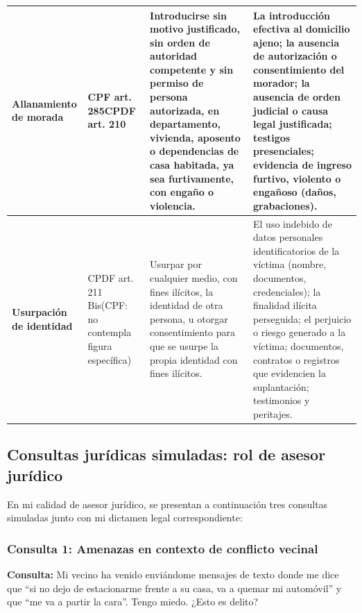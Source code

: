 \documentclass[12pt,letterpaper]{article}
\begin{document}
\begin{landscape}
\begin{longtable}{|>{\raggedright\arraybackslash}p{3.5cm}|>{\raggedright\arraybackslash}p{3cm}|>{\raggedright\arraybackslash}p{8cm}|>{\raggedright\arraybackslash}p{5cm}|}
\textbf{Allanamiento de morada} & CPF art. 285\newline CPDF art. 210 & 
Introducirse sin motivo justificado, sin orden de autoridad competente y sin permiso de persona autorizada, en departamento, vivienda, aposento o dependencias de casa habitada, ya sea furtivamente, con engaño o violencia. & 
La introducción efectiva al domicilio ajeno; la ausencia de autorización o consentimiento del morador; la ausencia de orden judicial o causa legal justificada; testigos presenciales; evidencia de ingreso furtivo, violento o engañoso (daños, grabaciones). \\
\hline

\textbf{Usurpación de identidad} & CPDF art. 211 Bis\newline (CPF: no contempla figura específica) & 
Usurpar por cualquier medio, con fines ilícitos, la identidad de otra persona, u otorgar consentimiento para que se usurpe la propia identidad con fines ilícitos. & 
El uso indebido de datos personales identificatorios de la víctima (nombre, documentos, credenciales); la finalidad ilícita perseguida; el perjuicio o riesgo generado a la víctima; documentos, contratos o registros que evidencien la suplantación; testimonios y peritajes. \\
\hline

\end{longtable}
\end{landscape}


\subsection{Consultas jurídicas simuladas: rol de asesor jurídico}

En mi calidad de asesor jurídico, se presentan a continuación tres consultas simuladas junto con mi dictamen legal correspondiente:

\subsubsection{Consulta 1: Amenazas en contexto de conflicto vecinal}

\textbf{Consulta:} Mi vecino ha venido enviándome mensajes de texto donde me dice que ``si no dejo de estacionarme frente a su casa, va a quemar mi automóvil'' y que ``me va a partir la cara''. Tengo miedo. ¿Esto es delito?
\end{document}
